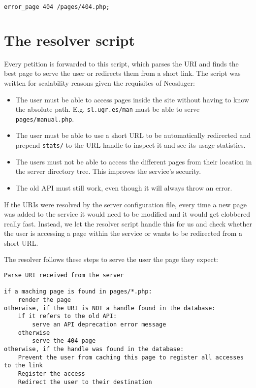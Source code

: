 \begin{lstlisting}
error_page 404 /pages/404.php;
\end{lstlisting}

\section{The resolver script}\label{the-resolver-script}

Every petition is forwarded to this script, which parses the URI and finds the best page to serve the user or redirects them from a short link.
The script was written for scalability reasons given the requisites of Neosluger:

\begin{itemize}
\item
	The user must be able to access pages inside the site without having to know the absolute path.
	E.g. \texttt{sl.ugr.es/man} must be able to serve \texttt{pages/manual.php}.
\item
	The user must be able to use a short URL to be automatically redirected and prepend \texttt{stats/} to the URL handle to inspect it and see its usage statistics.
\item
	The users must not be able to access the different pages from their location in the server directory tree.
	This improves the service's security.
\item
	The old API must still work, even though it will always throw an error.
\end{itemize}

If the URIs were resolved by the server configuration file, every time a new page was added to the service it would need to be modified and it would get clobbered really fast.
Instead, we let the resolver script handle this for us and check whether the user is accessing a page within the service or wants to be redirected from a short URL.

The resolver follows these steps to serve the user the page they expect:

\begin{lstlisting}
Parse URI received from the server

if a maching page is found in pages/*.php:
	render the page
otherwise, if the URI is NOT a handle found in the database:
	if it refers to the old API:
		serve an API deprecation error message
	otherwise
		serve the 404 page
otherwise, if the handle was found in the database:
	Prevent the user from caching this page to register all accesses to the link
	Register the access
	Redirect the user to their destination
\end{lstlisting}

